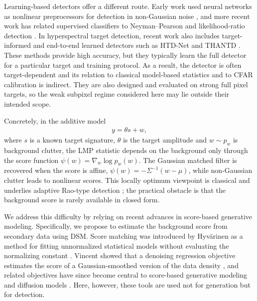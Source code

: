 Learning-based detectors offer a different route. Early work used neural networks as nonlinear preprocessors for detection in non-Gaussian noise \cite{lippmann1988adaptive,gandhi1997neural}, and more recent work has related supervised classifiers to Neyman--Pearson and likelihood-ratio detection \cite{jarabo2013radar}. In hyperspectral target detection, recent work also includes target-informed and end-to-end learned detectors such as HTD-Net and THANTD \cite{htd-net, thantd}. These methods provide high accuracy, but they typically learn the full detector for a particular target and training protocol. As a result, the detector is often target-dependent and its relation to classical model-based statistics and to CFAR calibration is indirect. They are also designed and evaluated on strong full pixel targets, so the
weak subpixel regime considered here may lie outside their intended scope.


\newpage
Concretely, in the additive model
\begin{align}\label{eq:additive_model}
    y = \theta s + w ,
\end{align}
where $s$ is a known target signature, $\theta$ is the target amplitude and $w \sim p_w$ is background clutter,
the LMP statistic depends on the background only through the score
function $\psi(w) = \nabla_w \log p_w(w)$.
The Gaussian matched filter is recovered when the score is affine,
$\psi(w)=-\Sigma^{-1}(w-\mu)$, while non-Gaussian clutter leads to nonlinear
scores. This locally optimum viewpoint is classical
\cite{capon1961asymptotic} and underlies adaptive Rao-type detection
\cite{kay1989asymptotically,demaio2007rao}; the practical obstacle is that the
background score is rarely available in closed form.

We address this difficulty by relying on recent advances in score-based generative modeling. Specifically, we propose to estimate the background score from secondary data using DSM. Score matching was introduced by Hyv\"arinen as a method for fitting unnormalized statistical models without evaluating the normalizing constant \cite{hyvarinen2005estimation}. Vincent showed that a denoising regression objective estimates the score of a Gaussian-smoothed version of the data density \cite{vincent2011connection}, and related objectives have since become central to score-based generative modeling and diffusion models \cite{song2020score,ho2020ddpm}. Here, however, these tools are used not for generation but for detection.

